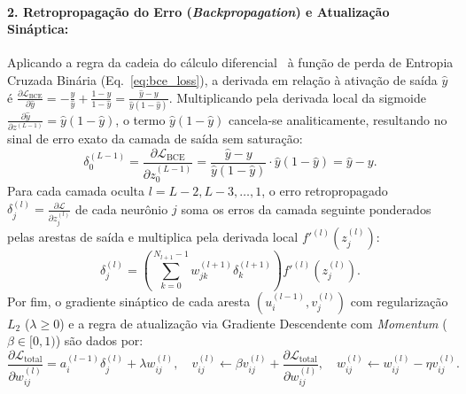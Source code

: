 ﻿\documentclass[runningheads]{llncs}
\begin{document}
\paragraph{2. Retropropaga\c{c}\~{a}o do Erro (\textit{Backpropagation}) e Atualiza\c{c}\~{a}o Sin\'{a}ptica:}
Aplicando a regra da cadeia do c\'{a}lculo diferencial~\cite{rumelhart1986learning} \`{a} fun\c{c}\~{a}o de perda de Entropia Cruzada Bin\'{a}ria (Eq.~\eqref{eq:bce_loss}), a derivada em rela\c{c}\~{a}o \`{a} ativa\c{c}\~{a}o de sa\'{i}da $\hat{y}$ \'{e} $\frac{\partial \mathcal{L}_{\text{BCE}}}{\partial \hat{y}} = -\frac{y}{\hat{y}} + \frac{1-y}{1-\hat{y}} = \frac{\hat{y}-y}{\hat{y}(1-\hat{y})}$. Multiplicando pela derivada local da sigmoide $\frac{\partial \hat{y}}{\partial z^{(L-1)}} = \hat{y}(1-\hat{y})$, o termo $\hat{y}(1-\hat{y})$ cancela-se analiticamente, resultando no sinal de erro exato da camada de sa\'{i}da sem satura\c{c}\~{a}o:
\begin{equation}
    \delta_0^{(L-1)} = \frac{\partial \mathcal{L}_{\text{BCE}}}{\partial z_0^{(L-1)}} = \frac{\hat{y} - y}{\hat{y}(1 - \hat{y})} \cdot \hat{y}(1 - \hat{y}) = \hat{y} - y.
    \label{eq:delta_out_bce}
\end{equation}
Para cada camada oculta $l = L-2, L-3, \dots, 1$, o erro retropropagado $\delta_j^{(l)} = \frac{\partial \mathcal{L}}{\partial z_j^{(l)}}$ de cada neur\^{o}nio $j$ soma os erros da camada seguinte ponderados pelas arestas de sa\'{i}da e multiplica pela derivada local $f'^{(l)}(z_j^{(l)})$:
\begin{equation}
    \delta_j^{(l)} = \left( \sum_{k=0}^{N_{l+1}-1} w_{jk}^{(l+1)} \delta_k^{(l+1)} \right) f'^{(l)}\!\left(z_j^{(l)}\right).
    \label{eq:delta_hidden}
\end{equation}
Por fim, o gradiente sin\'{a}ptico de cada aresta $(u_i^{(l-1)}, v_j^{(l)})$ com regulariza\c{c}\~{a}o $L_2$ ($\lambda \ge 0$) e a regra de atualiza\c{c}\~{a}o via Gradiente Descendente com \textit{Momentum} ($\beta \in [0, 1)$) s\~{a}o dados por:
\begin{equation}
    \frac{\partial \mathcal{L}_{\text{total}}}{\partial w_{ij}^{(l)}} = a_i^{(l-1)} \delta_j^{(l)} + \lambda w_{ij}^{(l)}, \quad v_{ij}^{(l)} \leftarrow \beta v_{ij}^{(l)} + \frac{\partial \mathcal{L}_{\text{total}}}{\partial w_{ij}^{(l)}}, \quad w_{ij}^{(l)} \leftarrow w_{ij}^{(l)} - \eta v_{ij}^{(l)}.
    \label{eq:weight_update}
\end{equation}
\end{document}
